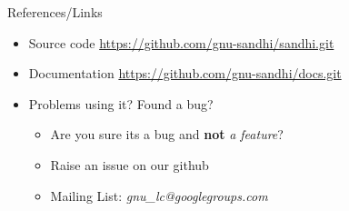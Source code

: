 \documentclass{beamer}
\begin{document}
\begin{frame}{References/Links}

\begin{itemize}
  \item Source code \url{https://github.com/gnu-sandhi/sandhi.git}
  \item Documentation \url{https://github.com/gnu-sandhi/docs.git}
  \item Problems using it? Found a bug?
  \begin{itemize}
 	\item Are you sure its a bug and \textbf{not} \textit{a feature}?
	\item Raise an issue on our github
	\item Mailing List: \textit{gnu\_lc@googlegroups.com}
  \end{itemize}
\end{itemize}

\vskip 1cm

\end{frame}
\end{document}
